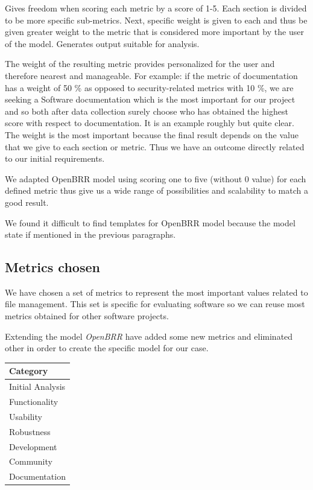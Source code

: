\documentclass[11pt]{scrartcl}
\begin{document}
\par Gives freedom when scoring each metric by a score of 1-5. Each section is divided to be more specific sub-metrics. Next, specific weight is given to each and thus be given greater weight to the metric that is considered more important by the user of the model. Generates output suitable for analysis.

\par The weight of the resulting metric provides personalized for the user and therefore nearest and manageable. For example: if the metric of documentation has a weight of 50 \% as opposed to security-related metrics with 10 \%, we are seeking a Software documentation which is the most important for our project and so both after data collection surely choose who has obtained the highest score with respect to documentation. It is an example roughly but quite clear. The weight is the most important because the final result depends on the value that we give to each section or metric. Thus we have an outcome directly related to our initial requirements.

\par We adapted OpenBRR model using scoring one to five (without 0 value) for each defined metric thus give us a wide range of possibilities and scalability to match a good result.

\par We found it difficult to find templates for OpenBRR model because the model state if mentioned in the previous paragraphs.

\subsection{Metrics chosen}

\par We have chosen a set of metrics to represent the most important values ​​related to file management. This set is specific for evaluating software so we can reuse most metrics obtained for other software projects.

\par Extending the model \emph{OpenBRR} have added some new metrics and eliminated other in order to create the specific model for our case.

\begin{table}[H]
\centering
\begin{tabular}{|l|}
    \hline {\bf Category}\\
    \hline Initial Analysis\\
    \hline Functionality\\
    \hline Usability\\
    \hline Robustness\\
    \hline Development\\
    \hline Community\\
    \hline Documentation\\
    \hline
\end{tabular}
\end{table}
\end{document}
